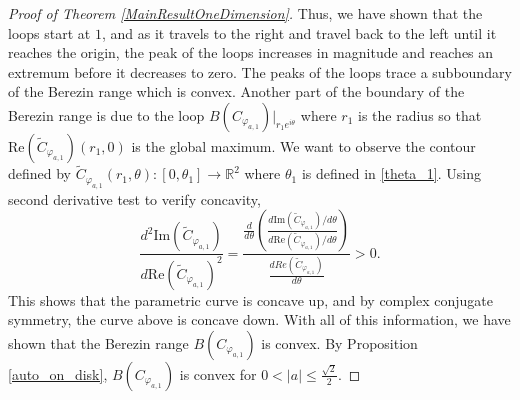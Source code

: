 \documentclass[10pt,a4paper]{amsart}
\begin{document}
\begin{proof}[Proof of Theorem \ref{MainResultOneDimension}]
Thus, we have shown that the loops start at $1$, and as it travels to the right and travel back to the left until it reaches the origin, the peak of the loops increases in magnitude and reaches an extremum before it decreases to zero. The peaks of the loops trace a subboundary of the Berezin range which is convex. Another part of the boundary of the Berezin range is due to the loop $B(C_{\varphi_{a,1}})|_{r_1e^{i\theta}}$ where $r_1$ is the radius so that $\mathrm{Re}(\widetilde{C}_{\varphi_{a,1}})(r_1,0)$ is the global maximum. We want to observe the contour defined by $\widetilde{C}_{\varphi_{a,1}}(r_1,\theta): [0,\theta_1] \rightarrow \mathbb{R}^2 $ where $\theta_1$ is defined in \eqref{theta_1}.  Using second derivative test to verify concavity, 
\[\dfrac{d^2\mathrm{Im}(\widetilde{C}_{\varphi_{a,1}})}{d\mathrm{Re}(\widetilde{C}_{\varphi_{a,1}})^2}=\dfrac{\frac{d}{d\theta}\left(\frac{d\mathrm{Im}(\widetilde{C}_{\varphi_{a,1}})/d\theta}{d\mathrm{Re}(\widetilde{C}_{\varphi_{a,1}})/d\theta}\right)}{\frac{dRe(\widetilde{C}_{\varphi_{a,1}})}{d\theta}} > 0.\]
This shows that the parametric curve is concave up, and by complex conjugate symmetry, the curve above is concave down. With all of this information, we have shown that the Berezin range $B(C_{\varphi_{a,1}})$ is convex. By Proposition \ref{auto_on_disk}, $B(C_{\varphi_{a,1}})$ is convex for $0< |a| \leq \frac{\sqrt{2}}{2}$.  
\end{proof}
\end{document}
